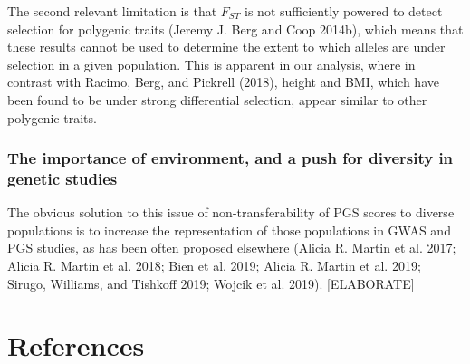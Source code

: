 \documentclass[
]{book}
\begin{document}
The second relevant limitation is that \(F_{ST}\) is not sufficiently powered to detect selection for polygenic traits (Jeremy J. Berg and Coop 2014b), which means that these results cannot be used to determine the extent to which alleles are under selection in a given population. This is apparent in our analysis, where in contrast with Racimo, Berg, and Pickrell (2018), height and BMI, which have been found to be under strong differential selection, appear similar to other polygenic traits.

\hypertarget{the-importance-of-environment-and-a-push-for-diversity-in-genetic-studies}{%
\subsection{The importance of environment, and a push for diversity in genetic studies}\label{the-importance-of-environment-and-a-push-for-diversity-in-genetic-studies}}

The obvious solution to this issue of non-transferability of PGS scores to diverse populations is to increase the representation of those populations in GWAS and PGS studies, as has been often proposed elsewhere (Alicia R. Martin et al. 2017; Alicia R. Martin et al. 2018; Bien et al. 2019; Alicia R. Martin et al. 2019; Sirugo, Williams, and Tishkoff 2019; Wojcik et al. 2019). {[}ELABORATE{]}

\hypertarget{references}{%
\chapter*{References}\label{references}}
\end{document}
